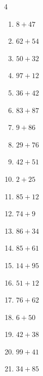 \begin{multicols}{4}
\begin{enumerate}
  \item $8+47$
        \phantom{$=55$}

  \item $62+54$
        \phantom{$=116$}

  \item $50+32$
        \phantom{$=82$}

  \item $97+12$
        \phantom{$=109$}

  \item $36+42$
        \phantom{$=78$}

  \item $83+87$
        \phantom{$=170$}

  \item $9+86$
        \phantom{$=95$}

  \item $29+76$
        \phantom{$=105$}

  \item $42+51$
        \phantom{$=93$}

  \item $2+25$
        \phantom{$=27$}

  \item $85+12$
        \phantom{$=97$}

  \item $74+9$
        \phantom{$=83$}

  \item $86+34$
        \phantom{$=120$}

  \item $85+61$
        \phantom{$=146$}

  \item $14+95$
        \phantom{$=109$}

  \item $51+12$
        \phantom{$=63$}

  \item $76+62$
        \phantom{$=138$}

  \item $6+50$
        \phantom{$=56$}

  \item $42+38$
        \phantom{$=80$}

\columnbreak %

  \item $99+41$
        \phantom{$=140$}

  \item $34+85$
        \phantom{$=119$}


\end{enumerate}
\end{multicols}
